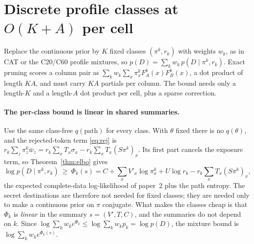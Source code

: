 \documentclass[11pt]{article}
\begin{document}
\section{\texorpdfstring{Discrete profile classes at $O(K+A)$ per cell}{Discrete profile classes at O(K+A) per cell}}
\label{sec:classes}

Replace the continuous prior by $K$ fixed classes $(\pi^k,r_k)$ with weights
$w_k$, as in CAT \citep{Lartillot2004} or the C20/C60 profile mixtures, so
$p(D)=\sum_kw_k\,p(D\mid\pi^k,r_k)$. Exact pruning scores a column pair as
$\sum_kw_k\sum_x\pi^k_xF^k_A(x)F^k_B(x)$, a dot product of length $KA$, and must
carry $KA$ partials per column. The bound needs only a length-$K$ and a
length-$A$ dot product per cell, plus a sparse correction.

\paragraph{The per-class bound is linear in shared summaries.} Use the same
class-free $q(\text{path})$ for every class. With $\theta$ fixed there is no
$q(\theta)$, and the rejected-token term \eqref{eq:rej} is
$r_k\sum_z\pi^k_z\bar w_z=r_k\sum_xT_x\sigma_x-r_k\sum_xT_x(S\pi^k)_x$. Its first
part cancels the exposure term, so Theorem~\ref{thm:elbo} gives
\begin{equation}\label{eq:Phi}
\log p(D\mid\pi^k,r_k)\ \ge\ \Phi_k(s)=C+\sum_xV'_x\log\pi^k_x+U\log r_k
 -r_k\sum_xT_x(S\pi^k)_x,
\end{equation}
the expected complete-data log-likelihood of paper~2 plus the path entropy.
The secret destinations are therefore not needed for fixed classes; they are
needed only to make a continuous prior on $\pi$ conjugate. What makes the
classes cheap is that $\Phi_k$ is \emph{linear} in the summary
$s=(V',T,C)$, and the summaries do not depend on $k$. Since
$\log\sum_kw_ke^{\Phi_k}\le\log\sum_kw_kp_k=\log p(D)$, the mixture bound is
$\log\sum_kw_ke^{\Phi_k(s)}$.
\end{document}
